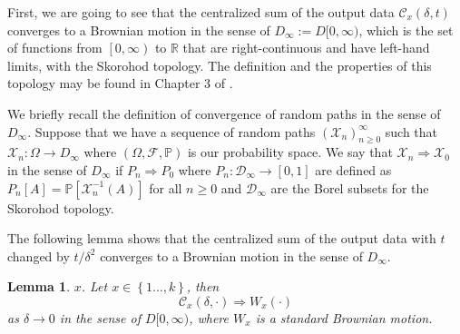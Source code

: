 \documentclass{wscpaperproc}
\theoremstyle{wsc}
\newtheorem{lemma}{Lemma}
\begin{document}
First, we are going to see that the centralized sum of the output
data $\mathcal{C}_x(\delta,t)$ converges to a Brownian motion in the sense of $D_{\infty}:=D[0,\infty)$,
which is the set of functions from $\left[0,\infty\right)$ to $\mathbb{R}$
that are right-continuous and have left-hand limits, with the Skorohod
topology. The definition and the properties of this topology may be
found in Chapter 3 of . 

We briefly recall the definition of convergence of random paths in
the sense of $D_{\infty}$. Suppose that we have a sequence of random
paths $\left(\mathcal{X}_{n}\right)_{n\geq0}^{\infty}$ such that
$\mathcal{X}_{n}:\varOmega\rightarrow D_{\infty}$ where $\left(\Omega,\mathcal{F},\mathbb{P}\right)$
is our probability space. We say that $\mathcal{X}_{n}\Rightarrow\mathcal{X}_{0}$
in the sense of $D_{\infty}$ if $P_{n}\Rightarrow P_{0}$ where $P_{n}:\mathcal{D}_{\infty}\rightarrow\left[0,1\right]$
are defined as $P_{n}\left[A\right]=\mathbb{P}\left[\mathcal{X}_{n}^{-1}\left(A\right)\right]$
for all $n\geq0$ and $\mathcal{D}_{\infty}$ are the Borel subsets
for the Skorohod topology.

The following lemma shows that the centralized sum of the output
data with $t$ changed by $t/\delta^{2}$ converges to a Brownian
motion in the sense of $D_{\infty}$. 
\\
\begin{lemma}
$x$. 
Let $x\in\left\{ 1\ldots,k\right\} $, then
\[
\mathcal{C}_{x}\left(\delta,\cdot\right)\Rightarrow W_{x}\left(\cdot\right)
\]
as $\delta\rightarrow0$ in the sense of $D[0,\infty)$, where $W_{x}$
is a standard Brownian motion.
\end{lemma}
\end{document}
